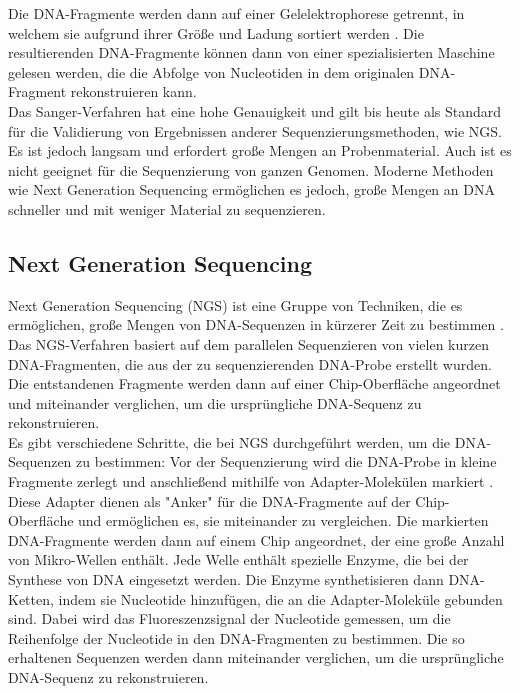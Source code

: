 \documentclass[oneside,bibliography=totocnumbered,BCOR=5mm]{scrbook}%
\theoremstyle{definition}
\theoremstyle{definition}
\theoremstyle{definition}
\theoremstyle{definition}
\theoremstyle{definition}
\theoremstyle{definition}
\begin{document}
Die DNA-Fragmente werden dann auf einer Gelelektrophorese getrennt, 
in welchem sie aufgrund ihrer Größe und Ladung sortiert werden \autocite[Seite 2]{metzker2005}. 
Die resultierenden DNA-Fragmente können dann von einer spezialisierten Maschine gelesen werden, 
die die Abfolge von Nucleotiden in dem originalen DNA-Fragment rekonstruieren kann. \\


Das Sanger-Verfahren hat eine hohe Genauigkeit und gilt bis heute als Standard für die Validierung von 
Ergebnissen anderer Sequenzierungsmethoden, wie NGS. 
Es ist jedoch langsam und erfordert große Mengen an Probenmaterial. 
Auch ist es nicht geeignet für die Sequenzierung von ganzen Genomen. 
Moderne Methoden wie Next Generation Sequencing ermöglichen es jedoch, große Mengen an DNA schneller und mit weniger Material zu sequenzieren. \\
\linebreak[4]


\subsection{Next Generation Sequencing}
Next Generation Sequencing (NGS) ist eine Gruppe von Techniken, die es ermöglichen, große Mengen 
von DNA-Sequenzen in kürzerer Zeit zu bestimmen \autocite[Seite 278]{NGS}. 
Das NGS-Verfahren basiert auf dem parallelen Sequenzieren von vielen kurzen DNA-Fragmenten, 
die aus der zu sequenzierenden DNA-Probe erstellt wurden. 
Die entstandenen Fragmente werden dann auf einer Chip-Oberfläche angeordnet und miteinander verglichen, 
um die ursprüngliche DNA-Sequenz zu rekonstruieren. \\


Es gibt verschiedene Schritte, die bei NGS durchgeführt werden, um die DNA-Sequenzen zu bestimmen: 
Vor der Sequenzierung wird die DNA-Probe in kleine Fragmente zerlegt und anschließend mithilfe von 
Adapter-Molekülen markiert \autocite[Seite 279]{NGS}.
Diese Adapter dienen als "Anker" für die DNA-Fragmente auf der Chip-Oberfläche und ermöglichen es, 
sie miteinander zu vergleichen.  
Die markierten DNA-Fragmente werden dann auf einem Chip angeordnet, 
der eine große Anzahl von Mikro-Wellen enthält. 
Jede Welle enthält spezielle Enzyme, die bei der Synthese von DNA eingesetzt werden. 
Die Enzyme synthetisieren dann DNA-Ketten, indem sie Nucleotide hinzufügen, 
die an die Adapter-Moleküle gebunden sind. Dabei wird das Fluoreszenzsignal der Nucleotide gemessen, 
um die Reihenfolge der Nucleotide in den DNA-Fragmenten zu bestimmen.
Die so erhaltenen Sequenzen werden dann miteinander verglichen, um die ursprüngliche DNA-Sequenz zu rekonstruieren. \\
\end{document}
